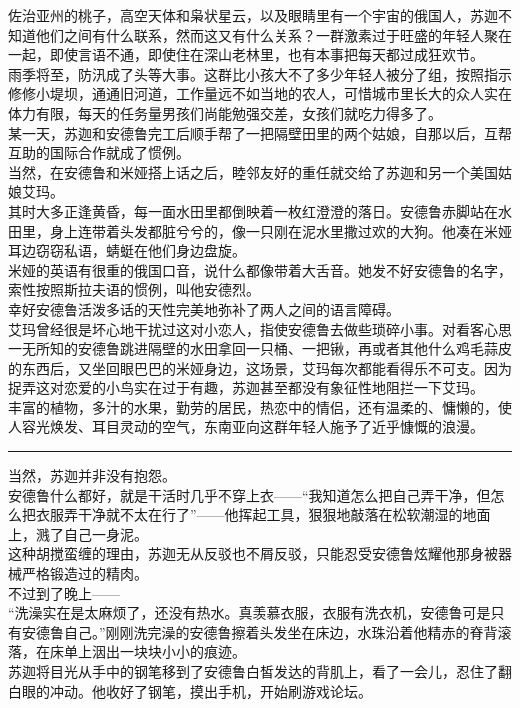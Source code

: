 \documentclass[oneside,11pt]{memoir} %
\begin{document}
\begin{CJK}{UTF8}{gbsn}
   佐治亚州的桃子，高空天体和枭状星云，以及眼睛里有一个宇宙的俄国人，苏迦不知道他们之间有什么联系，然而这又有什么关系？一群激素过于旺盛的年轻人聚在一起，即使言语不通，即使住在深山老林里，也有本事把每天都过成狂欢节。\\\indent
    雨季将至，防汛成了头等大事。这群比小孩大不了多少年轻人被分了组，按照指示修修小堤坝，通通旧河道，工作量远不如当地的农人，可惜城市里长大的众人实在体力有限，每天的任务量男孩们尚能勉强交差，女孩们就吃力得多了。\\\indent
   某一天，苏迦和安德鲁完工后顺手帮了一把隔壁田里的两个姑娘，自那以后，互帮互助的国际合作就成了惯例。\\\indent
   当然，在安德鲁和米娅搭上话之后，睦邻友好的重任就交给了苏迦和另一个美国姑娘艾玛。\\\indent
   其时大多正逢黄昏，每一面水田里都倒映着一枚红澄澄的落日。安德鲁赤脚站在水田里，身上连带着头发都脏兮兮的，像一只刚在泥水里撒过欢的大狗。他凑在米娅耳边窃窃私语，蜻蜓在他们身边盘旋。\\\indent
   米娅的英语有很重的俄国口音，说什么都像带着大舌音。她发不好安德鲁的名字，索性按照斯拉夫语的惯例，叫他安德烈。\\\indent
   幸好安德鲁活泼多话的天性完美地弥补了两人之间的语言障碍。\\\indent
   艾玛曾经很是坏心地干扰过这对小恋人，指使安德鲁去做些琐碎小事。对看客心思一无所知的安德鲁跳进隔壁的水田拿回一只桶、一把锹，再或者其他什么鸡毛蒜皮的东西后，又坐回眼巴巴的米娅身边，这场景，艾玛每次都能看得乐不可支。因为捉弄这对恋爱的小鸟实在过于有趣，苏迦甚至都没有象征性地阻拦一下艾玛。\\\indent
   丰富的植物，多汁的水果，勤劳的居民，热恋中的情侣，还有温柔的、慵懒的，使人容光焕发、耳目灵动的空气，东南亚向这群年轻人施予了近乎慷慨的浪漫。\\\indent
\rule{-3pt}{30pt} 
    当然，苏迦并非没有抱怨。\\\indent
    安德鲁什么都好，就是干活时几乎不穿上衣——“我知道怎么把自己弄干净，但怎么把衣服弄干净就不太在行了”——他挥起工具，狠狠地敲落在松软潮湿的地面上，溅了自己一身泥。\\\indent
    这种胡搅蛮缠的理由，苏迦无从反驳也不屑反驳，只能忍受安德鲁炫耀他那身被器械严格锻造过的精肉。\\\indent
    不过到了晚上——\\\indent
    “洗澡实在是太麻烦了，还没有热水。真羡慕衣服，衣服有洗衣机，安德鲁可是只有安德鲁自己。”刚刚洗完澡的安德鲁擦着头发坐在床边，水珠沿着他精赤的脊背滚落，在床单上洇出一块块小小的痕迹。\\\indent
    苏迦将目光从手中的钢笔移到了安德鲁白皙发达的背肌上，看了一会儿，忍住了翻白眼的冲动。他收好了钢笔，摸出手机，开始刷游戏论坛。\\\indent

\end{CJK}
\end{document}
